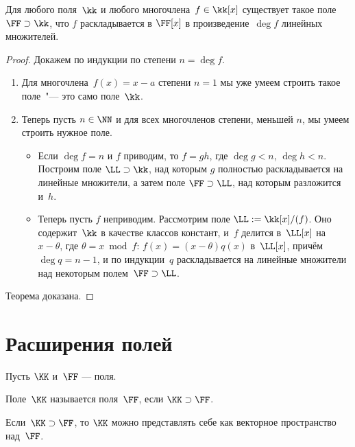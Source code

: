 % 

\begin{theorem}
	Для любого поля~$\kk$ и любого многочлена~$f \in \kk[x]$ существует такое поле~$\FF \supset \kk$, что $f$ раскладывается в $\FF[x]$ в произведение~$\deg{f}$ линейных множителей.
\end{theorem}
\begin{proof}
	Докажем по индукции по степени $n = \deg{f}$.
	\begin{enumerate}
		\item Для многочлена~$f(x) = x - a$ степени $n = 1$ мы уже умеем строить такое поле~"--- это само поле~$\kk$.

		\item Теперь пусть $n \in \NN$ и для всех многочленов степени, меньшей $n$, мы умеем строить нужное поле.
			\begin{itemize}
				\item Если $\deg{f} = n$ и $f$ приводим, то $f = gh$, где $\deg{g} < n$, $\deg{h} < n$. Построим поле $\LL \supset \kk$, над которым $g$ полностью раскладывается на линейные множители, а затем поле $\FF \supset \LL$, над которым разложится и~$h$.

				\item Теперь пусть $f$ неприводим. Рассмотрим поле $\LL := \kk[x]/(f)$. Оно содержит~$\kk$ в качестве классов констант, и~$f$ делится в~$\LL[x]$ на~$x - \theta$, где $\theta = x \bmod f$: $f(x) = (x - \theta) q(x)$ в~$\LL[x]$, причём $\deg{q} = n - 1$, и по индукции~$q$ раскладывается на линейные множители над некоторым полем~$\FF \supset \LL$.
			\end{itemize}
	\end{enumerate}
	Теорема доказана.
\end{proof}

\section{Расширения полей}

Пусть $\KK$ и~$\FF$ --- поля.

\begin{definition}
	Поле~$\KK$ называется  поля~$\FF$, если $\KK \supset \FF$.
\end{definition}

\begin{proposition}
	Если~$\KK \supset \FF$, то $\KK$ можно представлять себе как векторное пространство над~$\FF$.
\end{proposition}

